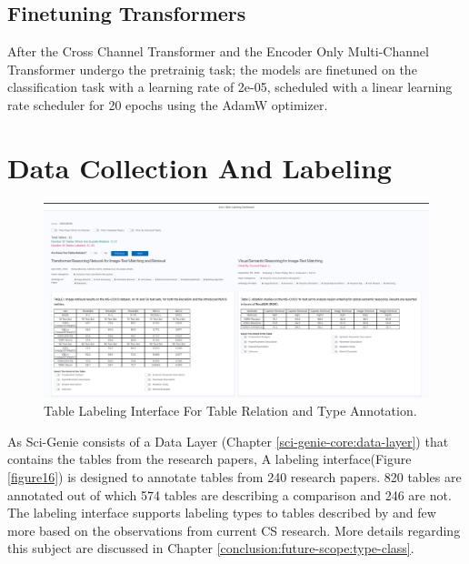 \subsection{Finetuning Transformers}
After the Cross Channel Transformer and the Encoder Only Multi-Channel Transformer undergo the pretrainig task; the models are finetuned on the classification task with a learning rate of 2e-05, scheduled with a linear learning rate scheduler for 20 epochs using the AdamW optimizer. 

\section{Data Collection And Labeling}
\label{table_classification:data-coll}

\begin{figure}[h]
    \centering
    \includegraphics[width=\maxwidth{\textwidth}]{src/images/table-lable-exp.pdf}
    \caption{Table Labeling Interface For Table Relation and Type Annotation. }
    \label{figure\arabic{figurecounter}}
\end{figure}

As Sci-Genie consists of a Data Layer (Chapter \ref{sci-genie-core:data-layer}) that contains the tables from the research papers, A labeling interface(Figure \ref{figure16}) is designed to annotate tables from 240 research papers. 820 tables are annotated out of which 574 tables are describing a comparison and 246 are not. The labeling interface supports labeling types to tables described by \cite{kim2012scientific} and few more based on the observations from current CS research. More details regarding this subject are discussed in Chapter \ref{conclusion:future-scope:type-class}. 

